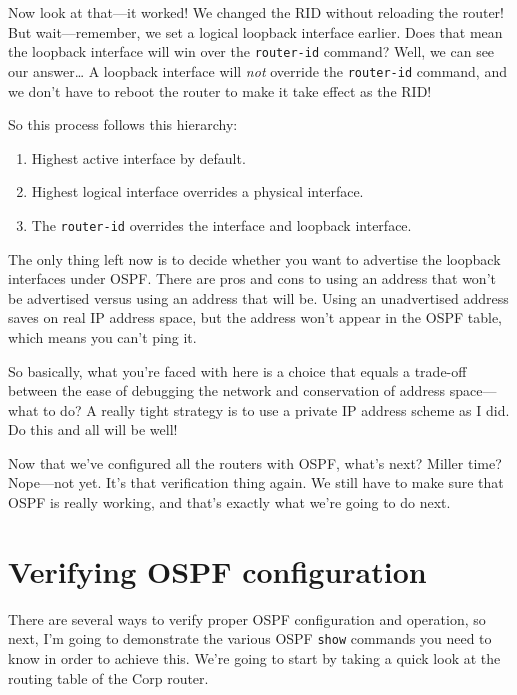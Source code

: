 \protect\hypertarget{c18.xhtmlux5cux23Page_765}{}{}Now look at that---it
worked! We changed the RID without reloading the router! But
wait---remember, we set a logical loopback interface earlier. Does that
mean the loopback interface will win over the \texttt{router-id}
command? Well, we can see our answer\ldots{} A loopback interface will
\emph{not} override the \texttt{router-id} command, and we don't have to
reboot the router to make it take effect as the RID!

So this process follows this hierarchy:

\begin{enumerate}
\tightlist
\item
  Highest active interface by default.
\item
  Highest logical interface overrides a physical interface.
\item
  The \texttt{router-id} overrides the interface and loopback interface.
\end{enumerate}

The only thing left now is to decide whether you want to advertise the
loopback interfaces under OSPF. There are pros and cons to using an
address that won't be advertised versus using an address that will be.
Using an unadvertised address saves on real IP address space, but the
address won't appear in the OSPF table, which means you can't ping it.

So basically, what you're faced with here is a choice that equals a
trade-off between the ease of debugging the network and conservation of
address space---what to do? A really tight strategy is to use a private
IP address scheme as I did. Do this and all will be well!

Now that we've configured all the routers with OSPF, what's next? Miller
time? Nope---not yet. It's that verification thing again. We still have
to make sure that OSPF is really working, and that's exactly what we're
going to do next.




\section{Verifying OSPF configuration}

There are several ways to verify proper OSPF configuration and
operation, so next, I'm going to demonstrate the various OSPF
\texttt{show} commands you need to know in order to achieve this. We're
going to start by taking a quick look at the routing table of the Corp
router.

